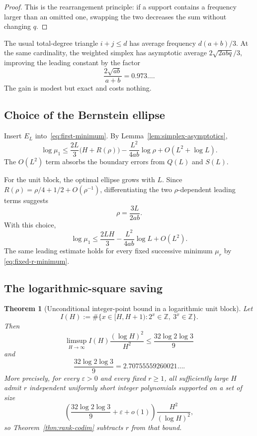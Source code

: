 \documentclass[11pt,oneside]{article}
\newtheorem{theorem}{Theorem}[section]
\theoremstyle{definition}
\theoremstyle{remark}
\newcommand{\Z}{\mathbb Z}
\begin{document}
\begin{proof}
This is the rearrangement principle: if a support contains a frequency larger than an omitted
one, swapping the two decreases the sum without changing $q$.
\end{proof}

The usual total-degree triangle $i+j\le d$ has average frequency
$d(a+b)/3$.  At the same cardinality, the weighted simplex has asymptotic average
$2\sqrt{2abq}/3$, improving the leading constant by the factor
\[
 \frac{2\sqrt{ab}}{a+b}=0.973\ldots.
\]
The gain is modest but exact and costs nothing.

\subsection{Choice of the Bernstein ellipse}

Insert $E_L$ into~\eqref{eq:first-minimum}.  By
Lemma~\ref{lem:simplex-asymptotics},
\begin{equation}
 \log\mu_1
 \le \frac{2L}{3}\bigl(H+R(\rho)\bigr)
      -\frac{L^2}{4ab}\log\rho
      +O(L^2+\log L).
 \label{eq:weighted-minimum}
\end{equation}
The $O(L^2)$ term absorbs the boundary errors from $Q(L)$ and $S(L)$.

For the unit block, the optimal ellipse grows with $L$.  Since
$R(\rho)=\rho/4+1/2+O(\rho^{-1})$, differentiating the two $\rho$-dependent leading terms
suggests
\begin{equation}
 \rho=\frac{3L}{2ab}.
 \label{eq:rho-optimal-unit}
\end{equation}
With this choice,
\begin{equation}
 \log\mu_1
 \le \frac{2LH}{3}-\frac{L^2}{4ab}\log L+O(L^2).
 \label{eq:unit-minimum-final}
\end{equation}
The same leading estimate holds for every fixed successive minimum $\mu_r$ by
\eqref{eq:fixed-r-minimum}.

\subsection{The logarithmic-square saving}

\begin{theorem}[Unconditional integer-point bound in a logarithmic unit block]
\label{thm:block-bound}
Let
\[
 I(H):=\#\{x\in[H,H+1):2^x\in\Z,\ 3^x\in\Z\}.
\]
Then
\begin{equation}
 \boxed{
 \limsup_{H\to\infty}
 I(H)\frac{(\log H)^2}{H^2}
 \le \frac{32\log2\log3}{9}}
 \label{eq:block-bound-main}
\end{equation}
and
\[
 \frac{32\log2\log3}{9}=2.70755559260021\ldots.
\]
More precisely, for every $\varepsilon>0$ and every fixed $r\ge1$, all sufficiently large
$H$ admit $r$ independent uniformly short integer polynomials supported on a set of size
\begin{equation}
 \left(\frac{32\log2\log3}{9}+\varepsilon+o(1)\right)
 \frac{H^2}{(\log H)^2},
 \label{eq:q-size}
\end{equation}
so Theorem~\ref{thm:rank-codim} subtracts $r$ from that bound.
\end{theorem}
\end{document}
